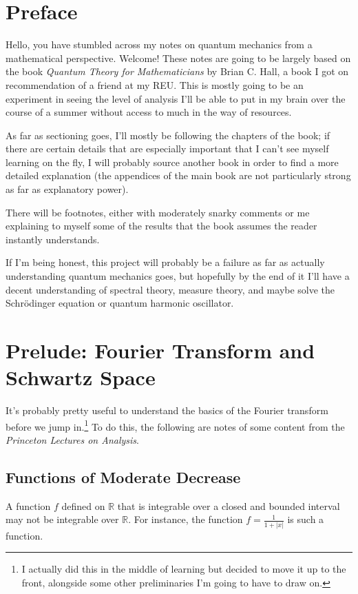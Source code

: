 \documentclass[10pt]{extarticle}
\title{}
\author{}
\date{}
\newcommand{\R}{\mathbb{R}}
\theoremstyle{plain}
\theoremstyle{definition}
\theoremstyle{remark}
\renewcommand{\newline}{\hfill\break}
\begin{document}
\tableofcontents
  \section{Preface}%
  Hello, you have stumbled across my notes on quantum mechanics from a mathematical perspective. Welcome! These notes are going to be largely based on the book \textit{Quantum Theory for Mathematicians} by Brian C. Hall, a book I got on recommendation of a friend at my REU. This is mostly going to be an experiment in seeing the level of analysis I'll be able to put in my brain over the course of a summer without access to much in the way of resources.\newline

  As far as sectioning goes, I'll mostly be following the chapters of the book; if there are certain details that are especially important that I can't see myself learning on the fly, I will probably source another book in order to find a more detailed explanation (the appendices of the main book are not particularly strong as far as explanatory power).\newline

  There will be footnotes, either with moderately snarky comments or me explaining to myself some of the results that the book assumes the reader instantly understands.\newline

  If I'm being honest, this project will probably be a failure as far as actually understanding quantum mechanics goes, but hopefully by the end of it I'll have a decent understanding of spectral theory, measure theory, and maybe solve the Schrödinger equation or quantum harmonic oscillator.
  \section{Prelude: Fourier Transform and Schwartz Space}%
  It's probably pretty useful to understand the basics of the Fourier transform before we jump in.\footnote{I actually did this in the middle of learning but decided to move it up to the front, alongside some other preliminaries I'm going to have to draw on.} To do this, the following are notes of some content from the \textit{Princeton Lectures on Analysis}. 
  \subsection{Functions of Moderate Decrease}%
  A function $f$ defined on $\R$ that is integrable over a closed and bounded interval may not be integrable over $\R$. For instance, the function $f = \frac{1}{1+|x|}$ is such a function.\newline
\end{document}
